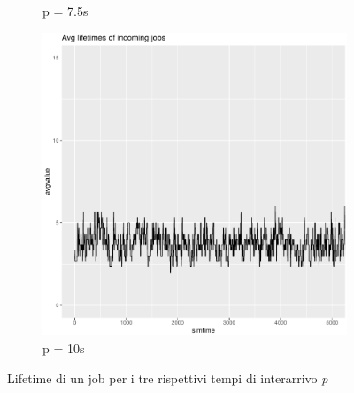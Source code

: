 \documentclass[a4paper,11pt]{article}
\begin{document}
\begin{figure}[h!]
\begin{subfigure}{.5\textwidth}
  \caption{p = 7.5s}
  \label{fig:sfig2}
\end{subfigure}
\begin{subfigure}{\textwidth}
  \centering
  \includegraphics[width=.45\linewidth]{images/chart-avglifetime-10.png}
  \caption{p = 10s}
  \label{fig:sfig2}
\end{subfigure}
\caption{Lifetime di un job per i tre rispettivi tempi di interarrivo \textit{p}}
\label{fig:fig}
\end{figure}
\newpage
\end{document}
